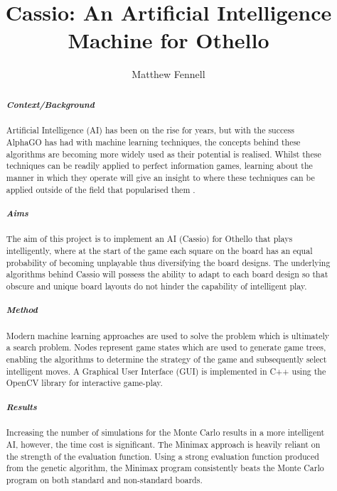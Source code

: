 \documentclass[12pt,a4paper]{article}
\title{Cassio: An Artificial Intelligence Machine for Othello}
\author{Matthew Fennell}
\date{}
\begin{document}
\maketitle

\begin{abstract}

\subparagraph{Context/Background}
Artificial Intelligence (AI) has been on the rise for years, but with the success AlphaGO has had with machine learning techniques, the concepts behind these algorithms are becoming more widely used as their potential is realised. Whilst these techniques can be readily applied to perfect information games, learning about the manner in which they operate will give an insight to where these techniques can be applied outside of the field that popularised them \cite{WinNT}.


\subparagraph{Aims}
The aim of this project is to implement an AI (Cassio) for Othello that plays intelligently, where at the start of the game each square on the board has an equal probability of becoming unplayable thus diversifying the board designs. The underlying algorithms behind Cassio will possess the ability to adapt to each board design so that obscure and unique board layouts do not hinder the capability of intelligent play.%

\subparagraph{Method}
Modern machine learning approaches are used to solve the problem which is ultimately a search problem. Nodes represent game states which are used to generate game trees, enabling the algorithms to determine the strategy of the game and subsequently select intelligent moves. A Graphical User Interface (GUI) is implemented in C++ using the OpenCV library for interactive game-play.

\subparagraph{Results}

Increasing the number of simulations for the Monte Carlo results in a more intelligent AI, however, the time cost is significant. The Minimax approach is heavily reliant on the strength of the evaluation function. Using a strong evaluation function produced from the genetic algorithm, the Minimax program consistently beats the Monte Carlo program on both standard and non-standard boards.



\end{abstract}
\end{document}
